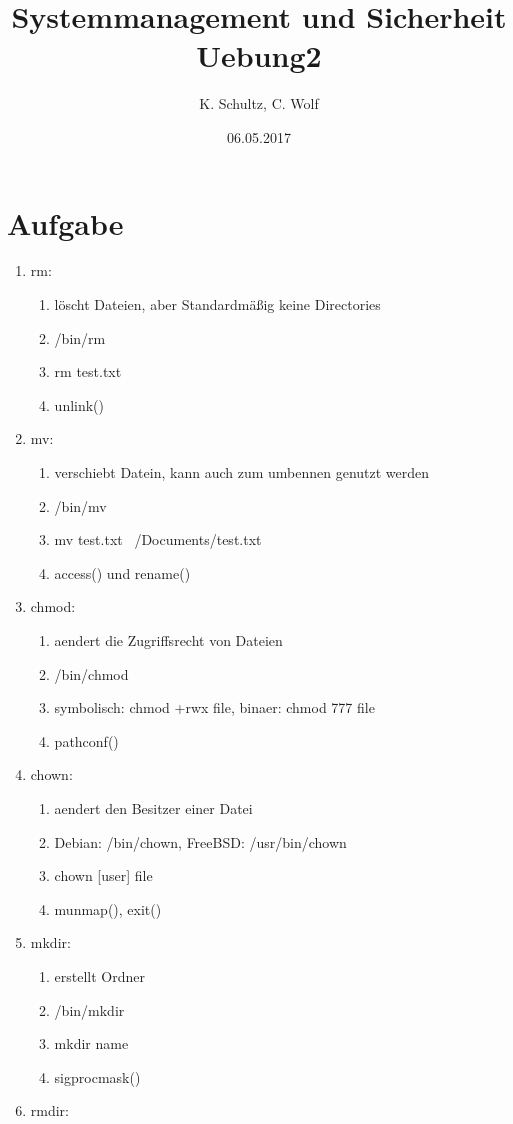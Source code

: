 \documentclass[11pt,a4paper,ngerman]{article}
\date{06.05.2017}
\author{K. Schultz, C. Wolf}
\title{Systemmanagement und Sicherheit Uebung2}
\begin{document}
\section{Aufgabe}
\begin{enumerate}
\item rm:
	\begin{enumerate}
		\item löscht Dateien, aber Standardmäßig keine Directories
		\item /bin/rm
		\item rm test.txt
		\item unlink()
	\end{enumerate}
\item mv:
	\begin{enumerate}
		\item verschiebt Datein, kann auch zum umbennen genutzt werden
		\item /bin/mv
		\item mv test.txt ~/Documents/test.txt
		\item access() und rename()
	\end{enumerate}
\item chmod:
	\begin{enumerate}
		\item aendert die Zugriffsrecht von Dateien
		\item /bin/chmod
		\item symbolisch: chmod +rwx file, binaer: chmod 777 file
		\item pathconf()
	\end{enumerate}
\item chown:
	\begin{enumerate}
		\item aendert den Besitzer einer Datei
		\item Debian: /bin/chown, FreeBSD: /usr/bin/chown
		\item chown [user] file
		\item munmap(), exit()
	\end{enumerate}
\item mkdir:
	\begin{enumerate}
		\item erstellt Ordner
		\item /bin/mkdir
		\item mkdir name
		\item sigprocmask()
	\end{enumerate}
\item rmdir:
	\begin{enumerate}

\end{enumerate}
\end{enumerate}
\end{document}
